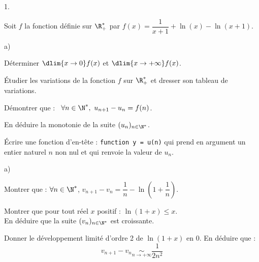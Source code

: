 \begin{noliste}{1.}
 \setlength{\itemsep}{4mm}
\item Soit $f$ la fonction définie sur $\R_+^*$ par $f(x) =
  \dfrac{1}{x + 1} + \ln(x)-\ln(x + 1)$.
  \begin{noliste}{a)}
    \setlength{\itemsep}{2mm}
  \item Déterminer $ \dlim{x \to 0} f(x)$ et $ \dlim{x \to + \infty}
    f(x)$.

    

  \item Étudier les variations de la fonction $f$ sur $\R_+^*$ et
    dresser son tableau de variations.

    

  \item Démontrer que : \ $\forall n \in \N^*, \ u_{n + 1}-u_{n} =
    f(n)$.

    




  \item En déduire la monotonie de la suite $(u_{n})_{n\in \N^*}$.

    

  \item Écrire une fonction d'en-tête : {\tt function y = u(n)} qui
    prend en argument un entier naturel $n$ non nul et qui renvoie la
    valeur de $u_{n}$.

    
  \end{noliste}




\item 
  \begin{noliste}{a)}
    \setlength{\itemsep}{2mm}
  \item Montrer que : $\forall n \in \N^*$, $v_{n + 1}-v_{n} =
    \dfrac{1}{n} - \ln \left(1 + \dfrac{1}{n} \right)$.

    

  \item Montrer que pour tout réel $x$ positif : $\ln(1 + x) \leq x$.\\
    En déduire que la suite $(v_{n})_{n \in \N^*}$ est croissante.

    

  \item Donner le développement limité d'ordre 2 de $\ln(1 + x)$ en
    $0$. En déduire que :
    \[
    v_{n + 1}-v_{n} \underset{n\to + \infty}{\sim} \frac{1}{2n^{2}}
    \]
  \end{noliste}


\end{noliste}
